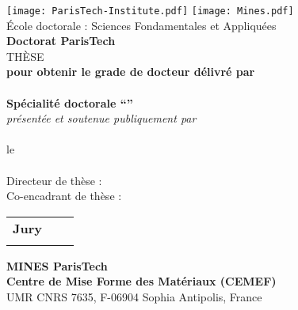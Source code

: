 \AddToShipoutPicture*{\BackgroundPic}
\AddToShipoutPicture*{\EtiquetteThese}
\makeatletter
  \begin{titlepage}
  \centering
      \texttt{[image: ParisTech-Institute.pdf]}
      \hfill
      \texttt{[image: Mines.pdf]}\\
    \vspace{1cm}
      {\Large \'{E}cole doctorale  : Sciences Fondamentales et Appliquées}\\
    \vspace{1cm}
      {\huge 
      	\textbf{Doctorat ParisTech}\\
    \vspace{0.5cm}
      	TH\`{E}SE}\\
    \vspace{1cm}
   		\textbf{pour obtenir le grade de docteur délivré par}\\
    \vspace{1cm}
    	{\huge\textbf{\@ecole}}\\
    \vspace{0.5cm}
    	{\Large\textbf{Spécialité doctorale ``\@specialite''}}\\
    \vspace{2cm}
    	\textit{présentée et soutenue publiquement par}\\
    \vspace{0.5cm}
    	{\Large \textbf{\@author}} \\
    \vspace{0.5cm}
    	le \@date \\
    \vfill
       {\LARGE \color[rgb]{0,0,1} \textbf{\@title}} \\
    \vfill
        Directeur de thèse : \textbf{\@directeur}\\
        Co-encadrant de thèse : \textbf{\@encadrant}\\
    \vfill
	\begin{tabular}{>{\bfseries}llr}
		\large Jury\\
		\@jurya
		\@juryb
		\@juryc
		\@juryd
		\@jurye
		\@juryf
		\@juryg
		\@juryh
		\@juryi
	\end{tabular}
	\vfill
	
	\textbf{MINES ParisTech\\
	Centre de Mise Forme des Mat\'{e}riaux (CEMEF)}\\
	UMR CNRS 7635, F-06904 Sophia Antipolis, France
  \end{titlepage}




  
  
  
\makeatother